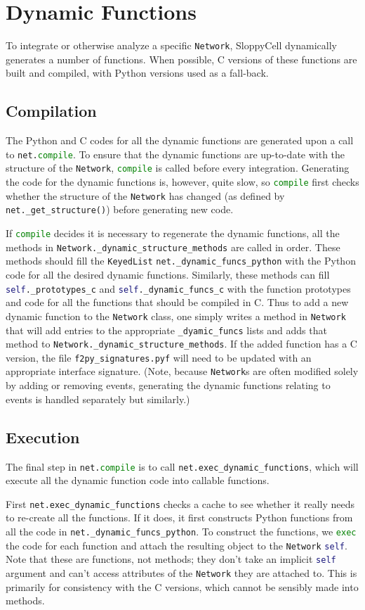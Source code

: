\documentclass[12pt]{article}
\makeatletter
\newcommand{\py}[1]{\lstinline[language=Python, showstringspaces=False]@#1@}
\newcommand{\filename}[1]{\texttt{#1}}
\makeatother
\begin{document}
\section{Dynamic Functions}
To integrate or otherwise analyze a specific \py{Network}, SloppyCell dynamically generates a number of functions.
When possible, C versions of these functions are built and compiled, with Python versions used as a fall-back.

\subsection{Compilation}
The Python and C codes for all the dynamic functions are generated upon a call to \py{net.compile}.
To ensure that the dynamic functions are up-to-date with the structure of the \py{Network}, \py{compile} is called before every integration.
Generating the code for the dynamic functions is, however, quite slow, so \py{compile} first checks whether the structure of the \py{Network} has changed (as defined by \py{net._get_structure()}) before generating new code.

If \py{compile} decides it is necessary to regenerate the dynamic functions, all the methods in \py{Network._dynamic_structure_methods} are called in order.
These methods should fill the \py{KeyedList} \py{net._dynamic_funcs_python} with the Python code for all the desired dynamic functions.
Similarly, these methods can fill \py{self._prototypes_c} and \py{self._dynamic_funcs_c} with the function prototypes and code for all the functions that should be compiled in C.
Thus to add a new dynamic function to the \py{Network} class, one simply writes a method in \py{Network} that will add entries to the appropriate \py{_dyamic_funcs} lists and adds that method to \py{Network._dynamic_structure_methods}.
If the added function has a C version, the file \filename{f2py\_signatures.pyf} will need to be updated with an appropriate interface signature.
(Note, because \py{Network}s are often modified solely by adding or removing events, generating the dynamic functions relating to events is handled separately but similarly.)

\subsection{Execution}
The final step in \py{net.compile} is to call \py{net.exec_dynamic_functions}, which will execute all the dynamic function code into callable functions.

First \py{net.exec_dynamic_functions} checks a cache to see whether it really needs to re-create all the functions.
If it does, it first constructs Python functions from all the code in \py{net._dynamic_funcs_python}.
To construct the functions, we \py{exec} the code for each function and attach the resulting object to the \py{Network} \py{self}.
Note that these are functions, not methods; they don't take an implicit \py{self} argument and can't access attributes of the \py{Network} they are attached to.
This is primarily for consistency with the C versions, which cannot be sensibly made into methods.
\end{document}
